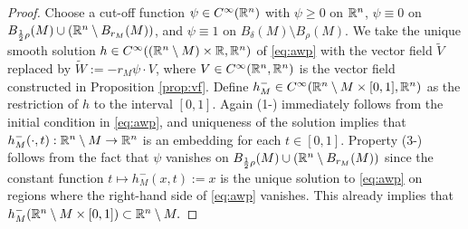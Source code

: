 \begin{proof}
Choose a cut-off function $\psi\in C^\infty(\mathbb{R}^n)$ with $\psi\ge 0$ on
$\mathbb{R}^n$, $\psi\equiv 0$ on $B_{\frac12{\rho}}(M)\cup(\mathbb{R}^n\setminus B_{r_M}(M))$,
and $\psi\equiv 1$ on $B_\delta(M)\setminus B_\rho(M)$. We take the unique
smooth solution $h\in C^\infty((\mathbb{R}^n\setminus M)\times \mathbb{R},\mathbb{R}^n)$ of 
\eqref{eq:awp} with the vector field $\tilde{V}$ replaced by $\tilde{W}:=-r_M\psi\cdot
V$, where $V\in C^\infty(\mathbb{R}^n,\mathbb{R}^n)$ is the vector field constructed in
Proposition \ref{prop:vf}. Define $h_M^-\in C^\infty(\mathbb{R}^n\setminus M\times [0,1],
\mathbb{R}^n)$ as the restriction of $h$ to the interval $[0,1]$. Again (1-) immediately
follows from the initial condition in \eqref{eq:awp}, and uniqueness of the solution
implies that $h_M^-(\cdot,t):\mathbb{R}^n\setminus M\to\mathbb{R}^n$ is an embedding for each 
$t\in [0,1]$. Property (3-) follows from the fact that $\psi$ vanishes on
$B_{\frac12{\rho}}(M)\cup(\mathbb{R}^n\setminus B_{r_M}(M))$ since the constant function 
$t\mapsto h_M^-(x,t):=x$ is the unique solution to \eqref{eq:awp} on regions
where the right-hand side of \eqref{eq:awp} vanishes. This already implies that
$h_M^-(\mathbb{R}^n\setminus M\times [0,1])\subset\mathbb{R}^n\setminus M.$


\end{proof}
